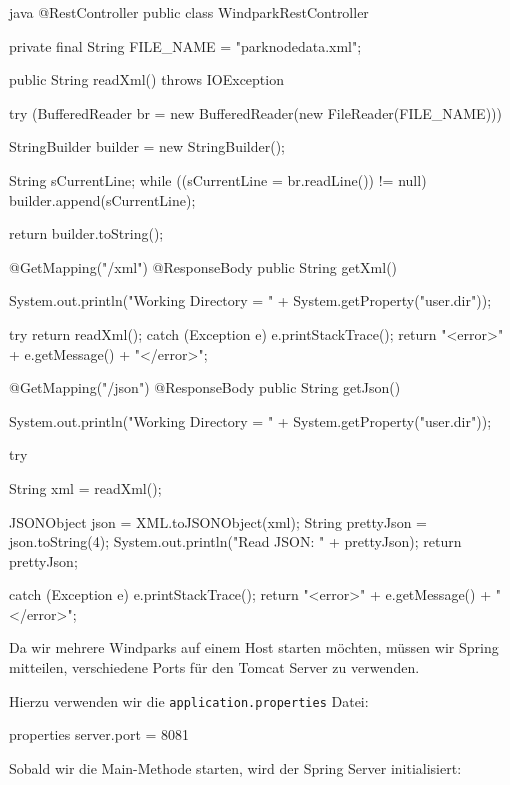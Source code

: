 \begin{code}{java}
    @RestController
    public class WindparkRestController {

        private final String FILE_NAME = "parknodedata.xml";

        public String readXml() throws IOException {
            try (BufferedReader br = new BufferedReader(new FileReader(FILE_NAME))) {
                StringBuilder builder = new StringBuilder();

                String sCurrentLine;
                while ((sCurrentLine = br.readLine()) != null) {
                    builder.append(sCurrentLine);
                }

                return builder.toString();
            }
        }

        @GetMapping("/xml")
        @ResponseBody
        public String getXml() {
            System.out.println("Working Directory = " + System.getProperty("user.dir"));

            try {
                return readXml();
            } catch (Exception e) {
                e.printStackTrace();
                return "<error>" + e.getMessage() + "</error>";
            }
        }


        @GetMapping("/json")
        @ResponseBody
        public String getJson() {
            System.out.println("Working Directory = " + System.getProperty("user.dir"));

            try {
                String xml = readXml();

                JSONObject json = XML.toJSONObject(xml);
                String prettyJson = json.toString(4);
                System.out.println("Read JSON: " + prettyJson);
                return prettyJson;
            } catch (Exception e) {
                e.printStackTrace();
                return "<error>" + e.getMessage() + "</error>";
            }
        }
    }
\end{code}

Da wir mehrere Windparks auf einem Host starten möchten, müssen wir Spring mitteilen, verschiedene Ports für den Tomcat Server zu verwenden.

Hierzu verwenden wir die \texttt{application.properties} Datei:

\begin{code}{properties}
    server.port = 8081
\end{code}


Sobald wir die Main-Methode starten, wird der Spring Server initialisiert:

